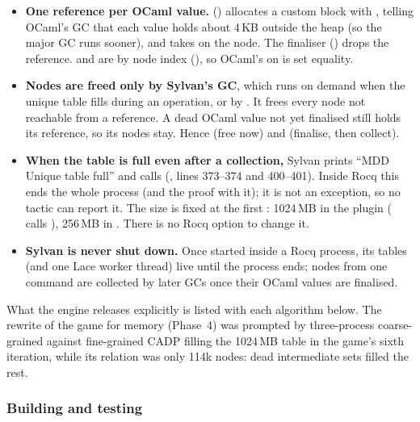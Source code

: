 \begin{itemize}
\item \textbf{One reference per OCaml value.} 
  () allocates a custom block with
  , telling OCaml's GC that each value
  holds about 4\,KB outside the heap (so the major GC runs sooner), and
  takes  on the node. The finaliser
  () drops the reference.
   and  are by node index
  (), so OCaml's \code{=} on 
  is set equality.
\item \textbf{Nodes are freed only by Sylvan's GC}, which runs on demand
  when the unique table fills during an operation, or by . It
  frees every node not reachable from a reference. A dead OCaml value not
  yet finalised still holds its reference, so its nodes stay. Hence
   (free now) and  (finalise, then collect).
\item \textbf{When the table is full even after a collection,} Sylvan
  prints ``MDD Unique table full'' and calls 
  (, lines 373--374 and 400--401). Inside
  Rocq this ends the whole process (and the proof with it); it is not an
  exception, so no tactic can report it.
  The size is fixed at the first : 1024\,MB in the plugin
  ( calls ), 256\,MB in
  . There is no Rocq option to change it.
\item \textbf{Sylvan is never shut down.} Once started inside a Rocq
  process, its tables (and one Lace worker thread) live until the process
  ends; nodes from one command are collected by later GCs once their OCaml
  values are finalised.
\end{itemize}

What the engine releases explicitly is listed with each algorithm below.
The rewrite of the game for memory (Phase~4) was prompted by three-process
coarse-grained against fine-grained CADP filling the 1024\,MB table in the game's sixth
iteration, while its relation was only 114k nodes: dead intermediate sets
filled the rest.

\subsubsection{Building and testing}

